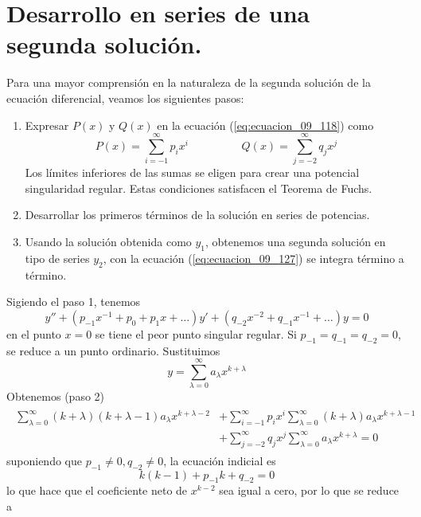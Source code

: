 \section{Desarrollo en series de una segunda solución.}
Para una mayor comprensión en la naturaleza de la segunda solución de la ecuación diferencial, veamos los siguientes pasos:
\begin{enumerate}
\item Expresar $P(x)$ y $Q(x)$ en la ecuación (\ref{eq:ecuacion_09_118}) como
\begin{equation}
P(x) = \sum_{i=-1}^{\infty} p_{i}x^{i} \hspace{2cm} Q(x) = \sum_{j=-2}^{\infty} q_{j} x^{j}
\label{eq:ecuacion_09_129}
\end{equation}
Los límites inferiores de las sumas se eligen para crear una potencial singularidad regular. Estas condiciones satisfacen el Teorema de Fuchs.
\item Desarrollar los primeros términos de la solución en series de potencias.
\item Usando la solución obtenida como $y_{1}$, obtenemos una segunda solución en tipo de series $y_{2}$, con la ecuación (\ref{eq:ecuacion_09_127}) se integra término a término.
\end{enumerate}
Sigiendo el paso 1, tenemos
\begin{equation}
y'' + (p_{-1} x^{-1} + p_{0} + p_{1} x + \ldots) y' + (q_{-2} x^{-2} + q_{-1} x^{-1} + \ldots) y = 0
\label{eq:ecuacion_09_130}
\end{equation}
en el punto $x=0$ se tiene el peor punto singular regular. Si $p_{-1} = q_{-1} = q_{-2} =0$, se reduce a un punto ordinario. Sustituimos
\[ y = \sum_{\lambda=0}^{\infty} a_{\lambda} x^{k + \lambda} \]
Obtenemos (paso 2)
\begin{eqnarray}
\begin{aligned}
\sum_{\lambda=0}^{\infty} (k + \lambda)(k + \lambda -1) a_{\lambda} x^{k + \lambda -2} &+ \sum_{i=-1}^{\infty} p_{i} x^{i} \sum_{\lambda=0}^{\infty} (k + \lambda) a_{\lambda} x^{k + \lambda -1} \nonumber \\
&+ \sum_{j=-2}^{\infty} q_{j} x^{j} \sum_{\lambda=0}^{\infty} a_{\lambda} x^{k + \lambda} = 0
\end{aligned}
\label{eq:ecuacion_09_131}
\end{eqnarray}
suponiendo que $p_{-1} \neq 0, q_{-2} \neq 0$, la ecuación indicial es
\[ k(k-1) + p_{-1} k + q_{-2} = 0 \]
lo que hace que el coeficiente neto de $x^{k-2}$ sea igual a cero, por lo que se reduce a
